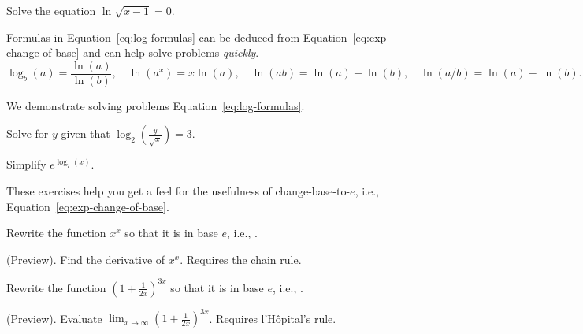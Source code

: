 \documentclass[../main.tex]{subfiles}
\begin{document}
\begin{exercise}
  Solve the equation \(\ln \sqrt{x - 1} = 0\). 

\end{exercise}


\clearpage

Formulas in Equation~\eqref{eq:log-formulas} can be deduced from Equation~\eqref{eq:exp-change-of-base} and can help solve problems \emph{quickly}. 
\begin{equation} \label{eq:log-formulas}
  \log_{b}(a) = \frac{\ln(a)}{\ln(b)},
  \quad
  \ln(a^{x}) = x \ln(a),
  \quad
  \ln(ab) = \ln(a) + \ln(b),
  \quad
  \ln(a/b) = \ln(a) - \ln(b).
\end{equation}

We demonstrate solving problems  Equation~\eqref{eq:log-formulas}.
\begin{example}
  Solve for \(y\) given that \(\log_{2}\left(\frac{y}{\sqrt{x}}\right) = 3\).

\end{example}

\begin{example}
  Simplify \(e^{\log_{7}(x)}\).

\end{example}
\clearpage

These exercises help you get a feel for the usefulness of change-base-to-\(e\), i.e., Equation~\eqref{eq:exp-change-of-base}. 

\begin{exercise} \label{ex:x-to-x}
  Rewrite the function \(x^{x}\) so that it is in base \(e\), i.e., . 


  (Preview). Find the derivative of \(x^{x}\). Requires the chain rule.

\end{exercise}

\begin{exercise}
  Rewrite the function \(\left(1 + \frac{1}{2x}\right)^{3x}\) so that it is in base \(e\), i.e., . 


  (Preview). Evaluate \(\lim_{x \to \infty} \left(1 + \frac{1}{2x}\right)^{3x}\). Requires l'H\^opital's rule.

\end{exercise}
\end{document}
